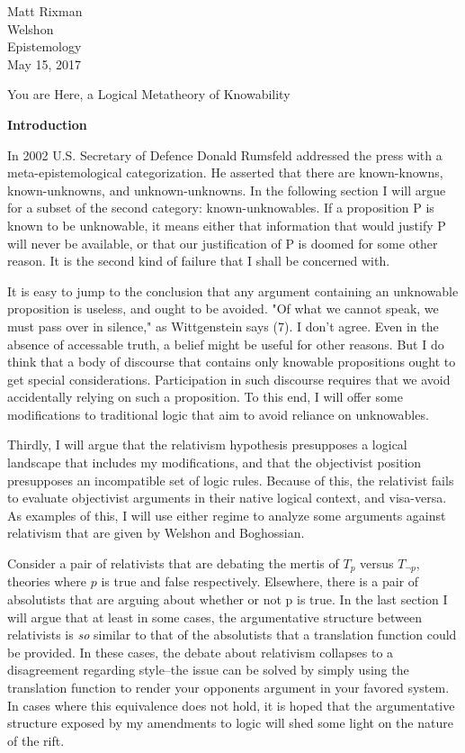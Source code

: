 \documentclass[12pt]{article}
\begin{document}
\begin{flushleft}

Matt Rixman\\
Welshon\\
Epistemology\\
May 15, 2017\\


\begin{center}
    You are Here, a Logical Metatheory of Knowability
\end{center}

\textbf{Introduction}
\setlength{\parindent}{0.5in}


In 2002 U.S. Secretary of Defence Donald Rumsfeld addressed the press with a meta-epistemological categorization.
He asserted that there are known-knowns, known-unknowns, and unknown-unknowns.
In the following section I will argue for a subset of the second category: known-unknowables.
If a proposition P is known to be unknowable, it means either that information that would justify P will never be available\footnotemark, or that our justification of P is doomed for some other reason.
It is the second kind of failure that I shall be concerned with.

It is easy to jump to the conclusion that any argument containing an unknowable proposition is useless, and ought to be avoided.
"Of what we cannot speak, we must pass over in silence," as Wittgenstein says (7).
I don't agree.
Even in the absence of accessable truth, a belief might be useful for other reasons.
But I do think that a body of discourse that contains only knowable propositions ought to get special considerations.
Participation in such discourse requires that we avoid accidentally relying on such a proposition.
To this end, I will offer some modifications to traditional logic that aim to avoid reliance on unknowables.

Thirdly, I will argue that the relativism hypothesis presupposes a logical landscape that includes my modifications, and that the objectivist position presupposes an incompatible set of logic rules.
Because of this, the relativist fails to evaluate objectivist arguments in their native logical context, and visa-versa.
As examples of this, I will use either regime to analyze some arguments against relativism that are given by Welshon and Boghossian.

Consider a pair of relativists that are debating the mertis of $T_p$ versus $T_{\neg p}$, theories where $p$ is true and false respectively.
Elsewhere, there is a pair of absolutists that are arguing about whether or not p is true.
In the last section I will argue that at least in some cases, the argumentative structure between relativists is \textit{so} similar to that of the absolutists that a translation function could be provided.
In these cases, the debate about relativism collapses to a disagreement regarding style--the issue can be solved by simply using the translation function to render your opponents argument in your favored system.
In cases where this equivalence does not hold, it is hoped that the argumentative structure exposed by my amendments to logic will shed some light on the nature of the rift.


\end{flushleft}
\end{document}
